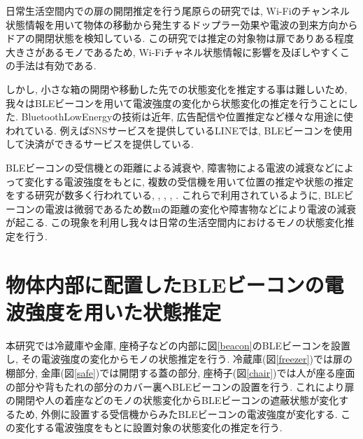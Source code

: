 \documentclass[Japanese]{dicomopapers}
\begin{document}
日常生活空間内での扉の開閉推定を行う尾原ら\cite{WifiChannel}の研究では, Wi-Fiのチャンネル状態情報を用いて物体の移動から発生するドップラー効果や電波の到来方向からドアの開閉状態を検知している.
この研究では推定の対象物は扉でありある程度大きさがあるモノであるため, Wi-Fiチャネル状態情報に影響を及ぼしやすくこの手法は有効である.

しかし, 小さな箱の開閉や移動した先での状態変化を推定する事は難しいため, 我々はBLEビーコンを用いて電波強度の変化から状態変化の推定を行うことにした.
BluetoothLowEnergyの技術は近年, 広告配信や位置推定など様々な用途に使われている.
例えばSNSサービスを提供しているLINEでは, BLEビーコンを使用して決済ができるサービスを提供している.\cite{bleUse}



BLEビーコンの受信機との距離による減衰や, 障害物による電波の減衰などによって変化する電波強度をもとに, 複数の受信機を用いて位置の推定や状態の推定をする研究が数多く行われている\cite{IoMT}, \cite{tandem}, \cite{blespot}, \cite{LANgate}, \cite{en-door}.
これらで利用されているように, BLEビーコンの電波は微弱であるため数mの距離の変化や障害物などにより電波の減衰が起こる.
この現象を利用し我々は日常の生活空間内におけるモノの状態変化推定を行う.










\section{物体内部に配置したBLEビーコンの電波強度を用いた状態推定}
本研究では冷蔵庫や金庫, 座椅子などの内部に図\ref{beacon}のBLEビーコンを設置し, その電波強度の変化からモノの状態推定を行う.
冷蔵庫(図\ref{freezer})では扉の棚部分, 金庫(図\ref{safe})では開閉する蓋の部分, 座椅子(図\ref{chair})では人が座る座面の部分や背もたれの部分のカバー裏へBLEビーコンの設置を行う.
これにより扉の開閉や人の着座などのモノの状態変化からBLEビーコンの遮蔽状態が変化するため, 外側に設置する受信機からみたBLEビーコンの電波強度が変化する.
この変化する電波強度をもとに設置対象の状態変化の推定を行う.
\end{document}
